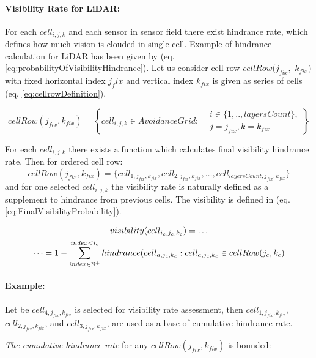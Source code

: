 \newpage\paragraph{Visibility Rate for  LiDAR:} For each $cell_{i,j,k}$ and each sensor in sensor field there exist hindrance rate, which defines how much vision is clouded in single cell. Example of hindrance calculation for LiDAR has been given by (eq. \ref{eq:probabilityOfVisibilityHindrance}). Let us consider cell row $cell Row (j_{fix},$ $k_{fix})$ with fixed horizontal index $j_fix$ and vertical index $k_{fix}$ is given as series of cells (eq. \ref{eq:cellrowDefinition}).

\begin{equation}\label{eq:cellrowDefinition}
    cellRow(j_{fix},k_{fix})= \left\{cell_{i,j,k}\in Avoidance Grid :\begin{aligned}&i\in\{1,..,layersCount\},\\&j=j_{fix}, k=k_{fix}\end{aligned}\right\}
\end{equation}

For each $cell_{i,j,k}$ there exists a function which calculates final visibility hindrance rate. Then for ordered cell row:
\begin{equation*}
    cell Row(j_{fix},k_{fix}) = \{cell_{1,j_{fix},k_{fix}},  cell_{2,j_{fix},k_{fix}}, \dots, cell_{layers Count,j_{fix},k_{fix}}\}    
\end{equation*}
and for one selected $cell_{i,j,k}$ the visibility rate is naturally defined as a supplement to hindrance from previous cells. The visibility is defined in (eq. \ref{eq:FinalVisibilityProbability}).

\begin{multline}\label{eq:FinalVisibilityProbability}
    visibility(cell_{i_c,j_c,k_c})=\dots\\ \dots =1 - \sum_{index\in\mathbb{N}^+}^{index < i_c} hindrance(cell_{a,j_c,k_c}: cell_{a,j_c,k_c}\in cell Row(j_{c},k_{c})
\end{multline}

\paragraph{Example:} Let be $cell_{4,j_{fix},k_{fix}}$ is selected for visibility rate assessment, then $cell_{1,j_{fix},k_{fix}}$, $cell_{2,j_{fix},k_{fix}}$, and $cell_{3,j_{fix},k_{fix}}$, are used as a base of cumulative hindrance rate.

\noindent \emph{The cumulative hindrance rate} for any $cell Row(j_{fix},k_{fix})$ is bounded:

